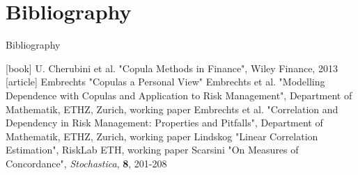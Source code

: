 \documentclass[11pt]{beamer}
\theoremstyle{plain}
\theoremstyle{definition}
\theoremstyle{remark}
\begin{document}
\section{Bibliography}

\begin{frame}{Bibliography}
\begin{thebibliography}{9}
[book]
 U. Cherubini et al. "Copula Methods in Finance", Wiley Finance, 2013
[article]
 Embrechts "Copulas a Personal View"
 Embrechts et al. "Modelling Dependence with Copulas and Application to Risk Management", Department of Mathematik, ETHZ, Zurich, working paper
 Embrechts et al. "Correlation and Dependency in Risk Management: Properties and Pitfalls", Department of Mathematik, ETHZ, Zurich, working paper
 Lindskog "Linear Correlation Estimation", RiskLab ETH, working paper
 Scarsini "On Measures of Concordance",  \textit{Stochastica}, \textbf{8}, 201-208
\end{thebibliography}
\end{frame}
\end{document}
